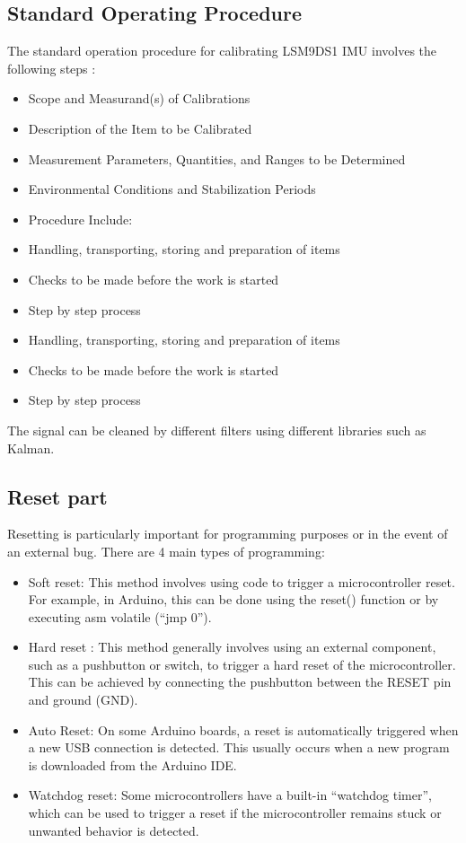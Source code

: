 \subsection{Standard Operating Procedure}

The standard operation procedure for calibrating LSM9DS1 IMU involves the following steps \cite{sugunsegu_imu_calibration:2024} :
\begin{itemize}
	\item Scope and Measurand(s) of Calibrations
	\item Description of the Item to be Calibrated
	\item Measurement Parameters, Quantities, and Ranges to be Determined
	\item Environmental Conditions and Stabilization Periods
	\item Procedure Include:
	\item Handling, transporting, storing and preparation of items
	\item Checks to be made before the work is started
	\item Step by step process
	\item Handling, transporting, storing and preparation of items
	\item Checks to be made before the work is started
	\item Step by step process
\end{itemize}


The signal can be cleaned by different filters using different libraries such as Kalman.


\subsection{Reset part}

Resetting is particularly important for programming purposes or in the event of an external bug. There are 4 main types of programming: 

\begin{itemize}
	\item Soft reset: This method involves using code to trigger a microcontroller reset. For example, in Arduino, this can be done using the reset() function or by executing asm volatile (“jmp 0”). \cite{instructables_reset_arduino:2024}
	\item Hard reset : This method generally involves using an external component, such as a pushbutton or switch, to trigger a hard reset of the microcontroller. This can be achieved by connecting the pushbutton between the RESET pin and ground (GND). \cite{arduino_reset:2024}
	\item Auto Reset: On some Arduino boards, a reset is automatically triggered when a new USB connection is detected. This usually occurs when a new program is downloaded from the Arduino IDE. \cite{stackoverflow_reset_arduino:2025}
	\item Watchdog reset: Some microcontrollers have a built-in “watchdog timer”, which can be used to trigger a reset if the microcontroller remains stuck or unwanted behavior is detected. \cite{youtube_watchdog_reset:2025}
	
\end{itemize}



